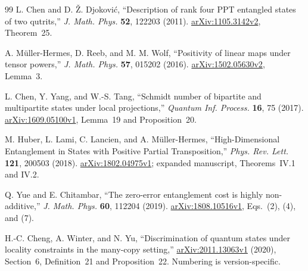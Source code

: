 \documentclass[11pt]{article}
\theoremstyle{definition}
\begin{document}
\begin{thebibliography}{99}
L. Chen and D. \v{Z}. Djokovi\'c, ``Description of rank four PPT entangled
states of two qutrits,'' \emph{J. Math. Phys.} \textbf{52}, 122203 (2011).
\href{https://arxiv.org/abs/1105.3142v2}{arXiv:1105.3142v2}, Theorem~25.

A. M\"uller-Hermes, D. Reeb, and M. M. Wolf, ``Positivity of linear maps
under tensor powers,'' \emph{J. Math. Phys.} \textbf{57}, 015202 (2016).
\href{https://arxiv.org/abs/1502.05630v2}{arXiv:1502.05630v2}, Lemma~3.

L. Chen, Y. Yang, and W.-S. Tang, ``Schmidt number of bipartite and
multipartite states under local projections,''
\emph{Quantum Inf. Process.} \textbf{16}, 75 (2017).
\href{https://arxiv.org/abs/1609.05100v1}{arXiv:1609.05100v1},
Lemma~19 and Proposition~20.

M. Huber, L. Lami, C. Lancien, and A. M\"uller-Hermes,
``High-Dimensional Entanglement in States with Positive Partial Transposition,''
\emph{Phys. Rev. Lett.} \textbf{121}, 200503 (2018).
\href{https://arxiv.org/abs/1802.04975v1}{arXiv:1802.04975v1};
expanded manuscript, Theorems~IV.1 and IV.2.

Q. Yue and E. Chitambar, ``The zero-error entanglement cost is highly
non-additive,'' \emph{J. Math. Phys.} \textbf{60}, 112204 (2019).
\href{https://arxiv.org/abs/1808.10516v1}{arXiv:1808.10516v1}, Eqs.~(2), (4), and (7).

H.-C. Cheng, A. Winter, and N. Yu, ``Discrimination of quantum states under
locality constraints in the many-copy setting,''
\href{https://arxiv.org/abs/2011.13063v1}{arXiv:2011.13063v1} (2020),
Section~6, Definition~21 and Proposition~22. Numbering is version-specific.

\end{thebibliography}
\end{document}
